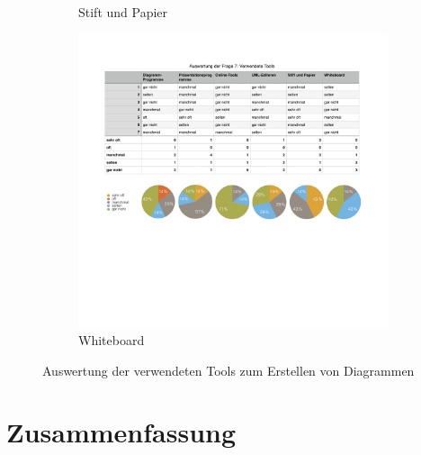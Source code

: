 \begin{figure}
\begin{minipage}{.65\textwidth}
\begin{subfigure}{\subfigurewidth}
        \caption{Stift und Papier}
        \label{fig:used-tools-charts-e}
    \end{subfigure}
    \begin{subfigure}{\subfigurewidth}
        \centering
        \includegraphics[scale=\graphicsscale]{resources/used-tools-charts-f}
        \caption{Whiteboard}
        \label{fig:used-tools-charts-f}
    \end{subfigure}
\end{minipage}
\caption{Auswertung der verwendeten Tools zum Erstellen von Diagrammen}
\label{fig:used-tools-charts}
\end{figure}




\section{Zusammenfassung}
